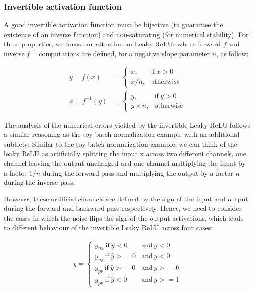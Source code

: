 \documentclass[twocolumn]{bmcart}
\begin{document}
\subsubsection{Invertible activation function}

A good invertible activation function must be bijective (to guarantee the existence of an inverse function) and non-saturating (for numerical stability).
For these properties, we focus our attention on Leaky ReLUs whose forward $f$ and inverse $f^{-1}$ computations are defined, for a negative slope parameter $n$, as follow:

\begin{subequations}
\begin{align}
y = f(x) &=      \begin{cases}
x, & \text{if}\ x>0 \\
x / n, & \text{otherwise}
\end{cases} \\
x = f^{-1}(y) &= \begin{cases}
y, & \text{if}\ y>0 \\
y \times n, & \text{otherwise}
\end{cases} 
\end{align}
\end{subequations}

The analysis of the numerical errors yielded by the invertible Leaky ReLU follows a similar reasoning as the toy batch normalization example with an additional subtlety:
Similar to the toy batch normalization example, we can think of the leaky ReLU as artificially splitting the input x across two different channels, one channel leaving the output unchanged and one channel multiplying the input by a factor $1/n$ during the forward pass and multiplying the output by a factor $n$ during the inverse pass.

However, these artificial channels are defined by the sign of the input and output during the forward and backward pass respectively.
Hence, we need to consider the cases in which the noise flips the sign of the output activations, 
which leads to different behaviour of the invertible Leaky ReLU across four cases: 

\begin{subequations}
\begin{align}
y = \begin{cases}
y_{nn} \  \text{if}\  \hat{y}<0    &\text{and}\  y<0  \\
y_{np} \  \text{if}\  \hat{y}>=0   &\text{and}\  y<0  \\
y_{pp} \  \text{if}\  \hat{y}>=0   &\text{and}\  y>=0 \\
y_{pn} \  \text{if}\  \hat{y}<0    &\text{and}\  y>=1 
\end{cases} 
\end{align}
\end{subequations}
\end{document}
